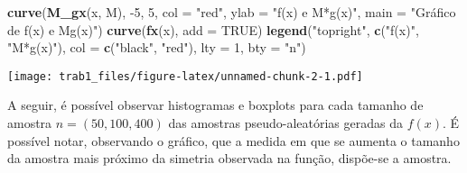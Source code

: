 \documentclass[11pt,]{article}
\newenvironment{Shaded}{\begin{snugshade}}{\end{snugshade}}
\newcommand{\DataTypeTok}[1]{\textcolor[rgb]{0.13,0.29,0.53}{#1}}
\newcommand{\DecValTok}[1]{\textcolor[rgb]{0.00,0.00,0.81}{#1}}
\newcommand{\KeywordTok}[1]{\textcolor[rgb]{0.13,0.29,0.53}{\textbf{#1}}}
\newcommand{\NormalTok}[1]{#1}
\newcommand{\OtherTok}[1]{\textcolor[rgb]{0.56,0.35,0.01}{#1}}
\newcommand{\StringTok}[1]{\textcolor[rgb]{0.31,0.60,0.02}{#1}}
\begin{document}
\begin{Shaded}
\begin{Highlighting}[]
\KeywordTok{curve}\NormalTok{(}\KeywordTok{M_gx}\NormalTok{(x, M), }\DecValTok{-5}\NormalTok{, }\DecValTok{5}\NormalTok{, }\DataTypeTok{col =} \StringTok{"red"}\NormalTok{, }\DataTypeTok{ylab =} \StringTok{"f(x) e M*g(x)"}\NormalTok{, }\DataTypeTok{main =} \StringTok{"Gráfico de f(x) e Mg(x)"}\NormalTok{)}
\KeywordTok{curve}\NormalTok{(}\KeywordTok{fx}\NormalTok{(x), }\DataTypeTok{add =} \OtherTok{TRUE}\NormalTok{)}
\KeywordTok{legend}\NormalTok{(}\StringTok{"topright"}\NormalTok{, }\KeywordTok{c}\NormalTok{(}\StringTok{"f(x)"}\NormalTok{, }\StringTok{"M*g(x)"}\NormalTok{), }\DataTypeTok{col =} \KeywordTok{c}\NormalTok{(}\StringTok{"black"}\NormalTok{, }\StringTok{"red"}\NormalTok{),}
\DataTypeTok{lty =} \DecValTok{1}\NormalTok{, }\DataTypeTok{bty =} \StringTok{"n"}\NormalTok{)}
\end{Highlighting}
\end{Shaded}

\texttt{[image: trab1\_files/figure-latex/unnamed-chunk-2-1.pdf]}

\newpage

A seguir, é possível observar histogramas e boxplots para cada tamanho
de amostra \(n = (50, 100, 400)\) das amostras pseudo-aleatórias geradas
da \(f(x)\). É possível notar, observando o gráfico, que a medida em que
se aumenta o tamanho da amostra mais próximo da simetria observada na
função, dispõe-se a amostra.
\end{document}
